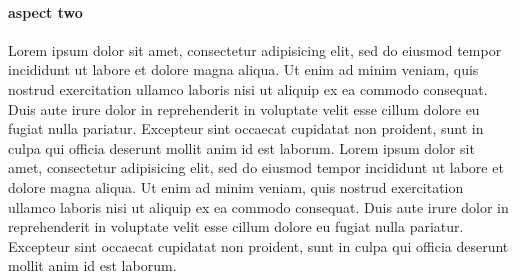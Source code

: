 \documentclass[a4paper, 11pt]{article}
\begin{document}
	\paragraph{aspect two} Lorem ipsum dolor sit amet, consectetur adipisicing elit, sed do eiusmod tempor incididunt ut labore et dolore magna aliqua. Ut enim ad minim veniam, quis nostrud exercitation ullamco laboris nisi ut aliquip ex ea commodo consequat. Duis aute irure dolor in reprehenderit in voluptate velit esse cillum dolore eu fugiat nulla pariatur. Excepteur sint occaecat cupidatat non proident, sunt in culpa qui officia deserunt mollit anim id est laborum. Lorem ipsum dolor sit amet, consectetur adipisicing elit, sed do eiusmod tempor incididunt ut labore et dolore magna aliqua. Ut enim ad minim veniam, quis nostrud exercitation ullamco laboris nisi ut aliquip ex ea commodo consequat. Duis aute irure dolor in reprehenderit in voluptate velit esse cillum dolore eu fugiat nulla pariatur. Excepteur sint occaecat cupidatat non proident, sunt in culpa qui officia deserunt mollit anim id est laborum.



\end{document}
